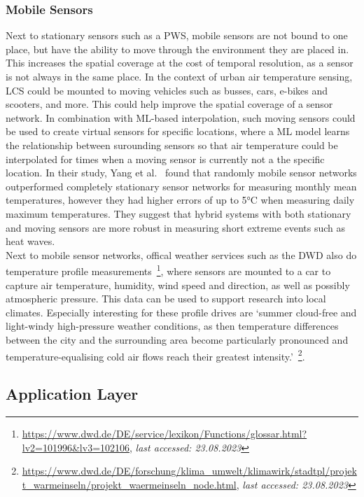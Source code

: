 \subsubsection{Mobile Sensors}

Next to stationary sensors such as a PWS, mobile sensors are not bound to one place, but have the ability to move through the environment they are placed in. This increases the spatial coverage at the cost of temporal resolution, as a sensor is not always in the same place. In the context of urban air temperature sensing, LCS could be mounted to moving vehicles such as busses, cars, e-bikes and scooters, and more. This could help improve the spatial coverage of a sensor network. In combination with ML-based interpolation, such moving sensors could be used to create virtual sensors for specific locations, where a ML model learns the relationship between surounding sensors so that air temperature could be interpolated for times when a moving sensor is currently not a the specific location. In their study, Yang et al.~\cite{yang2019designing} found that randomly mobile sensor networks outperformed completely stationary sensor networks for measuring monthly mean temperatures, however they had higher errors of up to 5°C when measuring daily maximum temperatures. They suggest that hybrid systems with both stationary and moving sensors are more robust in measuring short extreme events such as heat waves.\\
Next to mobile sensor networks, offical weather services such as the DWD also do temperature profile measurements~\footnote{\url{https://www.dwd.de/DE/service/lexikon/Functions/glossar.html?lv2=101996&lv3=102106}, \textit{last accessed: 23.08.2023}}, where sensors are mounted to a car to capture air temperature, humidity, wind speed and direction, as well as possibly atmospheric pressure. This data can be used to support research into local climates. Especially interesting for these profile drives are `summer cloud-free and light-windy high-pressure weather conditions, as then temperature differences between the city and the surrounding area become particularly pronounced and temperature-equalising cold air flows reach their greatest intensity.'~\footnote{\url{https://www.dwd.de/DE/forschung/klima\_umwelt/klimawirk/stadtpl/projekt\_warmeinseln/projekt\_waermeinseln\_node.html}, \textit{last accessed: 23.08.2023}}.

\subsection{Application Layer}

